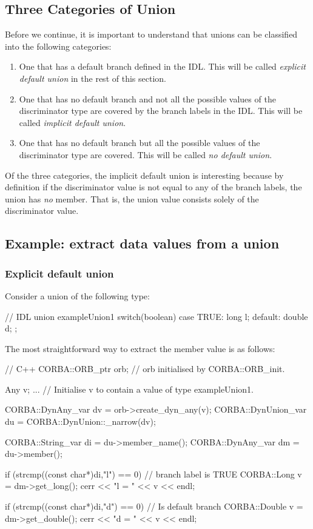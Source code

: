 \documentclass[11pt,twoside,a4paper]{book}
\newcommand{\term}[1]{\textit{#1}}
\begin{document}
\subsection{Three Categories of Union}
\label{dynunioncat}

Before we continue, it is important to understand that unions can be
classified into the following categories:

\begin{enumerate}
\item One that has a default branch defined in the IDL. This will be
called \term{explicit default union} in the rest of this section.
\item One that has no default branch and not all the possible values
of the discriminator type are covered by the branch labels in the IDL.
This will be called \term{implicit default union}.
\item One that has no default branch but all the possible values of
the discriminator type are covered. This will be called \term{no
default union}.
\end{enumerate}

Of the three categories, the implicit default union is interesting
because by definition if the discriminator value is not equal to any
of the branch labels, the union has \emph{no} member. That is, the
union value consists solely of the discriminator value.

\subsection{Example: extract data values from a union}

\subsubsection{Explicit default union}

Consider a union of the following type:

\begin{idllisting}
// IDL
union exampleUnion1 switch(boolean) {
case TRUE: long l;
default:   double d; 
};
\end{idllisting}

The most straightforward way to extract the member value is as
follows:

\begin{cxxlisting}
// C++
CORBA::ORB_ptr orb;  // orb initialised by CORBA::ORB_init.
  
Any v;
...       // Initialise v to contain a value of type exampleUnion1.
  
CORBA::DynAny_var dv = orb->create_dyn_any(v);
CORBA::DynUnion_var du = CORBA::DynUnion::_narrow(dv);
  
CORBA::String_var di = du->member_name();
CORBA::DynAny_var dm = du->member();
  
if (strcmp((const char*)di,"l") == 0) {
  // branch label is TRUE
  CORBA::Long v = dm->get_long();
  cerr << "l = " << v << endl;
}
  
if (strcmp((const char*)di,"d") == 0) {
  // Is default branch
  CORBA::Double v = dm->get_double();
  cerr << "d = " << v << endl;
}
\end{cxxlisting}
\end{document}
